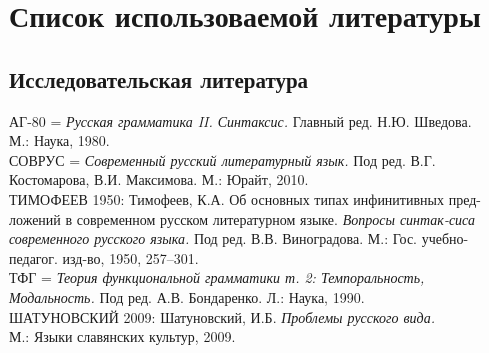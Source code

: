 \section*{Список использоваемой литературы}
\setlength{\parindent}{0cm}
\begin{normalsize}
\subsection*{Исследовательская литература}
АГ-80 = \textit{Русская грамматика II. Синтаксис.} Главный ред. Н.Ю. Шведова.\\\hspace*{4ex}М.: Наука, 1980.\\
СОВРУС = \textit{Современный русский литературный язык.} Под ред. В.Г.\\\hspace*{4ex}Костомарова, В.И. Максимова. М.: Юрайт, 2010.\\
ТИМОФЕЕВ 1950: Тимофеев, К.А. Об основных типах инфинитивных пред-\hspace*{4ex}ложений в современном русском литературном языке. \textit{Вопросы синтак-\hspace*{4ex}сиса современного русского языка.} Под ред. В.В. Виноградова. М.: Гос. \hspace*{4ex}учебно-педагог. изд-во, 1950, 257--301.\\
ТФГ = \textit{Теория функциональной грамматики т. 2: Темпоральность, \\\hspace*{4ex}Модальность.} Под ред. А.В. Бондаренко. Л.: Наука, 1990.\\
ШАТУНОВСКИЙ 2009: Шатуновский, И.Б. \textit{Проблемы русского вида.} \\\hspace*{4ex}М.: Языки славянских культур, 2009. 



\end{normalsize}
